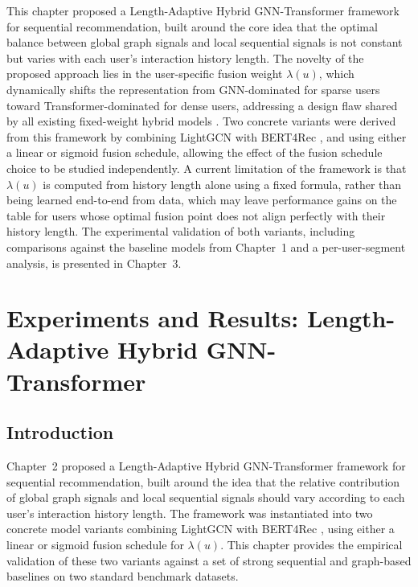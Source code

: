 \documentclass[12pt,a4paper]{report}
\begin{document}
This chapter proposed a Length-Adaptive Hybrid GNN-Transformer framework for
sequential recommendation, built around the core idea that the optimal balance
between global graph signals and local sequential signals is not constant but
varies with each user's interaction history length. The novelty of the proposed
approach lies in the user-specific fusion weight \(\lambda(u)\), which
dynamically shifts the representation from GNN-dominated for sparse users
toward Transformer-dominated for dense users, addressing a design flaw shared
by all existing fixed-weight hybrid models \citep{wu2020gnnsurvey,
pan2024survey}. Two concrete variants were derived from this framework by
combining LightGCN \citep{he2020lightgcn} with BERT4Rec
\citep{sun2019bert4rec}, and using either a linear or sigmoid fusion schedule,
allowing the effect of the fusion schedule choice to be studied independently.
A current limitation of the framework is that \(\lambda(u)\) is computed from
history length alone using a fixed formula, rather than being learned
end-to-end from data, which may leave performance gains on the table for users
whose optimal fusion point does not align perfectly with their history length.
The experimental validation of both variants, including comparisons against the
baseline models from Chapter~1 and a per-user-segment analysis, is presented
in Chapter~3.

\chapter{Experiments and Results: Length-Adaptive Hybrid GNN-Transformer}

\section{Introduction}

Chapter~2 proposed a Length-Adaptive Hybrid GNN-Transformer framework for
sequential recommendation, built around the idea that the relative contribution
of global graph signals and local sequential signals should vary according to
each user's interaction history length. The framework was instantiated into two
concrete model variants combining LightGCN \citep{he2020lightgcn} with
BERT4Rec \citep{sun2019bert4rec}, using either a linear or sigmoid fusion
schedule for \(\lambda(u)\). This chapter provides the empirical validation of
these two variants against a set of strong sequential and graph-based baselines
on two standard benchmark datasets.
\end{document}
